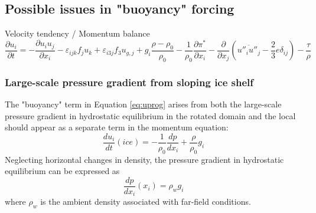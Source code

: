     \subsection{Possible issues in "buoyancy" forcing}

    Velocity tendency / Momentum balance
	\begin{equation} \label{eq:uprog}
	\frac{\partial u_i}{\partial t} = 
	- \frac{\partial u_i u_j}{\partial x_i}
	- \varepsilon_{ijk} f_j u_k 
	+ \varepsilon_{i3j} f_3 u_{g,j}
	+ g_i \frac{\rho - \rho_0}{\rho_0}
	- \frac{1}{\rho_0}\frac{\partial \pi^*}{\partial x_i}
	- \frac{\partial}{\partial x_j}(\overline{u''_i u''_j} - \frac{2}{3}e\delta_{ij})
	- \frac{\tau}{\rho}
	\end{equation}
	
	\subsubsection{Large-scale pressure gradient from sloping ice shelf}
	The "buoyancy" term in Equation \ref{eq:uprog} arises from both the large-scale pressure gradient in hydrostatic equilibrium in the rotated domain and the local  should appear as a separate term in the momentum equation:
	\begin{equation}
	    \frac{du_i}{dt}(ice) = -\frac{1}{\rho_0}\frac{dp}{dx_i} + \frac{\rho}{\rho_0}g_i
	\end{equation}
	Neglecting horizontal changes in density, the pressure gradient in hydrostatic equilibrium can be expressed as
	\begin{equation}
	    \frac{dp}{dx_i}(x_i) = \rho_w g_i%
	\end{equation}
	where $\rho_w$ is the ambient density associated with far-field conditions.
	
